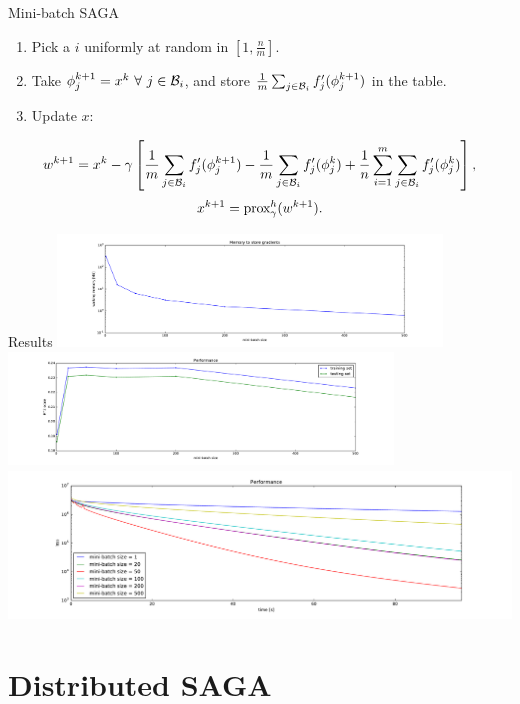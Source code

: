 \documentclass[11Pt,t,compress]{beamer}
\begin{document}
\begin{frame}{Mini-batch SAGA}
	\vfill

	\begin{enumerate}
	\item Pick a $i$ uniformly at random in $[1, \frac{n}m]$.
	\item Take $\phi_j^{k+1} = x^k \ \forall \ j \in \mathcal{B}_i$, and store $\frac1m
		\sum_{j\in\mathcal{B}_i} f_j'(\phi_j^{k+1})$ in the table.
	\item Update $x$:
	\end{enumerate}

	\begin{equation*}
	w^{k+1} = x^k - \gamma \left[ \frac1m \sum_{j\in\mathcal{B}_i} f_j'(\phi_j^{k+1})
	- \frac1m \sum_{j\in\mathcal{B}_i} f_j'(\phi_j^k)
	+ \frac1n \sum_{i=1}^m \sum_{j\in\mathcal{B}_i} f_j'(\phi_j^k) \right] ,
	\end{equation*}
	$$x^{k+1} = \textrm{prox}_\gamma^h (w^{k+1}).$$

	\vfill
\end{frame}

\begin{frame}{Results}
	\includegraphics[height=3cm,width=0.5\columnwidth]{figs/memory}
	\includegraphics[height=3cm,width=0.5\columnwidth]{figs/r2_score}
	\vfill
	\includegraphics[height=4cm,width=\columnwidth]{figs/perf}
\end{frame}

\section{Distributed SAGA}
\end{document}
